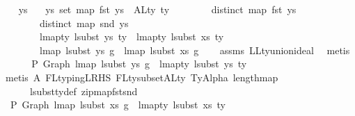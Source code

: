 \begin{isabellebody}
\ \ \isamarkupfalse%
\ ys\ \isanewline
\ \ ys{\isacharcolon}{\kern0pt}\ {\isachardoublequoteopen}set\ {\isacharparenleft}{\kern0pt}map\ fst\ ys{\isacharparenright}{\kern0pt}\ {\isacharequal}{\kern0pt}\ ALty\ ty\isanewline
\ \ \ \ \ \ \ {\isasymand}\ distinct\ {\isacharparenleft}{\kern0pt}map\ fst\ ys{\isacharparenright}{\kern0pt}\isanewline
\ \ \ \ \ \ \ {\isasymand}\ distinct\ {\isacharparenleft}{\kern0pt}map\ snd\ ys{\isacharparenright}{\kern0pt}\isanewline
\ \ \ \ \ \ \ {\isasymand}\ lmap{\isacharunderscore}{\kern0pt}ty\ {\isacharparenleft}{\kern0pt}lsubst\ ys{\isacharparenright}{\kern0pt}\ ty\ {\isacharequal}{\kern0pt}\ lmap{\isacharunderscore}{\kern0pt}ty\ {\isacharparenleft}{\kern0pt}lsubst\ xs{\isacharparenright}{\kern0pt}\ ty\isanewline
\ \ \ \ \ \ \ {\isasymand}\ lmap\ {\isacharparenleft}{\kern0pt}lsubst\ ys{\isacharparenright}{\kern0pt}\ g\ {\isacharequal}{\kern0pt}\ lmap\ {\isacharparenleft}{\kern0pt}lsubst\ xs{\isacharparenright}{\kern0pt}\ g{\isachardoublequoteclose}\isanewline
\ \ \isamarkupfalse%
\ assms\ LLty{\isacharunderscore}{\kern0pt}union{\isacharunderscore}{\kern0pt}ideal\ \isamarkupfalse%
\ metis\isanewline
\isanewline
\ \ \isamarkupfalse%
\ \isamarkupfalse%
\ {\isachardoublequoteopen}{\isasymGamma}\ {\isasymturnstile}{\isacharbraceleft}{\kern0pt}P{\isacharbraceright}{\kern0pt}\ Graph\ {\isacharparenleft}{\kern0pt}lmap\ {\isacharparenleft}{\kern0pt}lsubst\ ys{\isacharparenright}{\kern0pt}\ g{\isacharparenright}{\kern0pt}\ {\isacharcolon}{\kern0pt}\ lmap{\isacharunderscore}{\kern0pt}ty\ {\isacharparenleft}{\kern0pt}lsubst\ ys{\isacharparenright}{\kern0pt}\ ty{\isachardoublequoteclose}\isanewline
\ \ \ \ \isamarkupfalse%
\ {\isacharparenleft}{\kern0pt}metis\ A{}\ FL{\isacharunderscore}{\kern0pt}typing{\isacharunderscore}{\kern0pt}LRHS\ FLty{\isacharunderscore}{\kern0pt}subset{\isacharunderscore}{\kern0pt}ALty\ TyAlpha\ length{\isacharunderscore}{\kern0pt}map\isanewline
\ \ \ \ \ \ lsubst{\isacharunderscore}{\kern0pt}ty{\isacharunderscore}{\kern0pt}def\ zip{\isacharunderscore}{\kern0pt}map{\isacharunderscore}{\kern0pt}fst{\isacharunderscore}{\kern0pt}snd{\isacharparenright}{\kern0pt}\isanewline
\ \ \isamarkupfalse%
\ \isamarkupfalse%
\ {\isachardoublequoteopen}{\isasymGamma}\ {\isasymturnstile}{\isacharbraceleft}{\kern0pt}P{\isacharbraceright}{\kern0pt}\ Graph\ {\isacharparenleft}{\kern0pt}lmap\ {\isacharparenleft}{\kern0pt}lsubst\ xs{\isacharparenright}{\kern0pt}\ g{\isacharparenright}{\kern0pt}\ {\isacharcolon}{\kern0pt}\ lmap{\isacharunderscore}{\kern0pt}ty\ {\isacharparenleft}{\kern0pt}lsubst\ xs{\isacharparenright}{\kern0pt}\ ty{\isachardoublequoteclose}\isanewline

\end{isabellebody}
